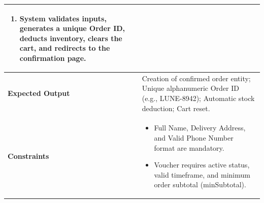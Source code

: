 \documentclass[12pt,a4paper,oneside]{report}
\begin{document}
\begin{longtable}{|p{3.6cm}|p{11.9cm}|}
\begin{enumerate}[leftmargin=*,nosep,topsep=2pt]
  \item System validates inputs, generates a unique Order ID, deducts inventory, clears the cart, and redirects to the confirmation page.
\end{enumerate} \\
\hline
\textbf{Expected Output} & Creation of confirmed order entity; Unique alphanumeric Order ID (e.g., LUNE-8942); Automatic stock deduction; Cart reset. \\
\hline
\textbf{Constraints} & \begin{itemize}[leftmargin=*,nosep,topsep=2pt]
  \item Full Name, Delivery Address, and Valid Phone Number format are mandatory.
  \item Voucher requires active status, valid timeframe, and minimum order subtotal (minSubtotal).
\end{itemize} \\
\hline
\end{longtable}
\end{document}
